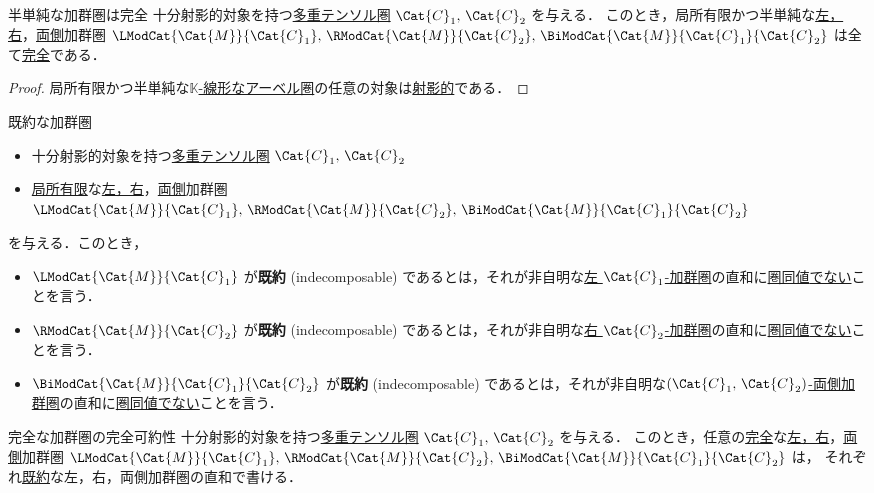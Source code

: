 \documentclass[TQFT_main]{subfiles}
\begin{document}
\begin{mylem}[label=lem:mod-exact]{半単純な加群圏は完全}
    十分射影的対象を持つ\hyperref[def:tensorfusion-cat]{多重テンソル圏} $\Cat{C}_1,\, \Cat{C}_2$ を与える．
    このとき，局所有限かつ半単純な\hyperref[def:modulecat]{左，右}，\hyperref[def:bimodulecat]{両側}加群圏 $\LModCat{\Cat{M}}{\Cat{C}_1},\, \RModCat{\Cat{M}}{\Cat{C}_2},\, \BiModCat{\Cat{M}}{\Cat{C}_1}{\Cat{C}_2}$ は全て\hyperref[def:modulecat-exact]{完全}である．
\end{mylem}

\begin{proof}
    局所有限かつ半単純な\hyperref[def:additive-cat]{$\mathbb{K}$-線形なアーベル圏}の任意の対象は\hyperref[def:finite-abcat]{射影的}である．
\end{proof}

\begin{mydef}[label=def:modulecat-indecomposable]{既約な加群圏}
    \begin{itemize}
        \item 十分射影的対象を持つ\hyperref[def:tensorfusion-cat]{多重テンソル圏} $\Cat{C}_1,\, \Cat{C}_2$
        \item \hyperref[def:finite-abcat]{局所有限}な\hyperref[def:modulecat]{左，右}，\hyperref[def:bimodulecat]{両側}加群圏 $\LModCat{\Cat{M}}{\Cat{C}_1},\, \RModCat{\Cat{M}}{\Cat{C}_2},\, \BiModCat{\Cat{M}}{\Cat{C}_1}{\Cat{C}_2}$
    \end{itemize}
    を与える．このとき，
    \begin{itemize}
        \item  $\LModCat{\Cat{M}}{\Cat{C}_1}$ が\textbf{既約} (indecomposable) であるとは，それが非自明な\hyperref[def:modulecat]{左 $\Cat{C}_1$-加群圏}の直和に\hyperref[def:equiv-1Cat]{圏同値}\underline{でない}ことを言う．
        \item  $\RModCat{\Cat{M}}{\Cat{C}_2}$ が\textbf{既約} (indecomposable) であるとは，それが非自明な\hyperref[def:modulecat]{右 $\Cat{C}_2$-加群圏}の直和に\hyperref[def:equiv-1Cat]{圏同値}\underline{でない}ことを言う．
        \item  $\BiModCat{\Cat{M}}{\Cat{C}_1}{\Cat{C}_2}$ が\textbf{既約} (indecomposable) であるとは，それが非自明な\hyperref[def:bimodulecat]{$(\Cat{C}_1,\, \Cat{C}_2)$-両側加群圏}の直和に\hyperref[def:equiv-1Cat]{圏同値}\underline{でない}ことを言う．
    \end{itemize}
\end{mydef}

\begin{mytheo}[label=thm:modulecat-complete-reducible]{完全な加群圏の完全可約性}
    十分射影的対象を持つ\hyperref[def:tensorfusion-cat]{多重テンソル圏} $\Cat{C}_1,\, \Cat{C}_2$ を与える．
    このとき，任意の\hyperref[def:modulecat-exact]{完全}な\hyperref[def:modulecat]{左，右}，\hyperref[def:bimodulecat]{両側}加群圏 $\LModCat{\Cat{M}}{\Cat{C}_1},\, \RModCat{\Cat{M}}{\Cat{C}_2},\, \BiModCat{\Cat{M}}{\Cat{C}_1}{\Cat{C}_2}$ は，
    それぞれ\hyperref[def:moduleat-indecomposable]{既約}な左，右，両側加群圏の直和で書ける．
\end{mytheo}
\end{document}
